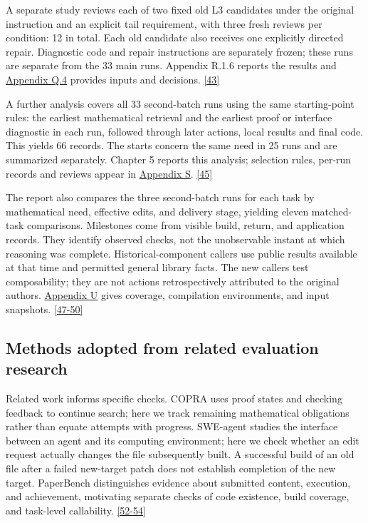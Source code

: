 A separate study reviews each of two fixed old L3 candidates under the original instruction and an explicit tail requirement, with three fresh reviews per condition: 12 in total. Each old candidate also receives one explicitly directed repair. Diagnostic code and repair instructions are separately frozen; these runs are separate from the 33 main runs. Appendix R.1.6 reports the results and \href{en-appendix.pdf\#q4}{Appendix Q.4} provides inputs and decisions. \hyperlink{ref-43}{\mbox{[43]}}

A further analysis covers all 33 second-batch runs using the same starting-point rules: the earliest mathematical retrieval and the earliest proof or interface diagnostic in each run, followed through later actions, local results and final code. This yields 66 records. The starts concern the same need in 25 runs and are summarized separately. Chapter 5 reports this analysis; selection rules, per-run records and reviews appear in \href{en-appendix.pdf\#appendix-s}{Appendix S}. \hyperlink{ref-45}{\mbox{[45]}}

The report also compares the three second-batch runs for each task by mathematical need, effective edits, and delivery stage, yielding eleven matched-task comparisons. Milestones come from visible build, return, and application records. They identify observed checks, not the unobservable instant at which reasoning was complete. Historical-component callers use public results available at that time and permitted general library facts. The new callers test composability; they are not actions retrospectively attributed to the original authors. \href{en-appendix.pdf\#appendix-u}{Appendix U} gives coverage, compilation environments, and input snapshots. \hyperlink{ref-47}{\mbox{[47-50]}}

\subsection[Methods adopted from related evaluation research]{\texorpdfstring{\protect\hypertarget{section-2-6}{}Methods adopted from related evaluation research}{Methods adopted from related evaluation research}}
Related work informs specific checks. COPRA uses proof states and checking feedback to continue search; here we track remaining mathematical obligations rather than equate attempts with progress. SWE-agent studies the interface between an agent and its computing environment; here we check whether an edit request actually changes the file subsequently built. A successful build of an old file after a failed new-target patch does not establish completion of the new target. PaperBench distinguishes evidence about submitted content, execution, and achievement, motivating separate checks of code existence, build coverage, and task-level callability. \hyperlink{ref-52}{\mbox{[52-54]}}

